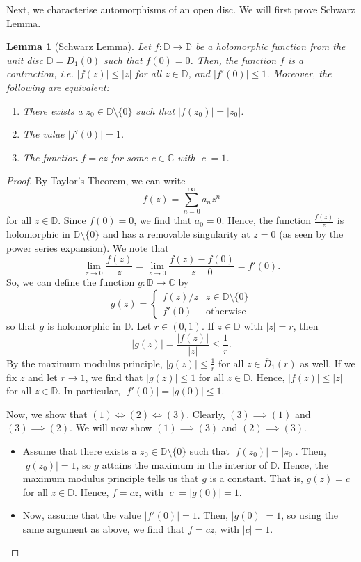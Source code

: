 \documentclass[a4paper, openany]{memoir}
\theoremstyle{definition}
\theoremstyle{plain}
\newtheorem{lemma}[definition]{Lemma}
\begin{document}
    Next, we characterise automorphisms of an open disc. We will first prove Schwarz Lemma.
    \begin{lemma}[Schwarz Lemma]
        Let $f \colon \mathbb{D} \to \mathbb{D}$ be a holomorphic function from the unit disc $\mathbb{D} = D_1(0)$ such that $f(0) = 0$. Then, the function $f$ is a contraction, i.e. $|f(z)| \leq |z|$ for all $z \in \mathbb{D}$, and $|f'(0)| \leq 1$. Moreover, the following are equivalent:
        \begin{enumerate}
            \item There exists a $z_0 \in \mathbb{D} \setminus \{0\}$ such that $|f(z_0)| = |z_0|$.
            \item The value $|f'(0)| = 1$.
            \item The function $f = cz$ for some $c \in \mathbb{C}$ with $|c| = 1$.
        \end{enumerate}
    \end{lemma}
    \begin{proof}
        By Taylor's Theorem, we can write
        \[f(z) = \sum_{n=0}^\infty a_n z^n\]
        for all $z \in \mathbb{D}$. Since $f(0) = 0$, we find that $a_0 = 0$. Hence, the function $\frac{f(z)}{z}$ is holomorphic in $\mathbb{D} \setminus \{0\}$ and has a removable singularity at $z = 0$ (as seen by the power series expansion). We note that
        \[\lim_{z \to 0} \frac{f(z)}{z} = \lim_{z \to 0} \frac{f(z) - f(0)}{z - 0} = f'(0).\]
        So, we can define the function $g \colon \mathbb{D} \to \mathbb{C}$ by
        \[g(z) = \begin{cases}
            f(z)/z & z \in \mathbb{D} \setminus \{0\} \\
            f'(0) & \textrm{otherwise}
        \end{cases}\]
        so that $g$ is holomorphic in $\mathbb{D}$. Let $r \in (0, 1)$. If $z \in \mathbb{D}$ with $|z| = r$, then
        \[|g(z)| = \frac{|f(z)|}{|z|} \leq \frac{1}{r}.\]
        By the maximum modulus principle, $|g(z)| \leq \frac{1}{r}$ for all $z \in \overline{D}_1(r)$ as well. If we fix $z$ and let $r \to 1$, we find that $|g(z)| \leq 1$ for all $z \in \mathbb{D}$. Hence, $|f(z)| \leq |z|$ for all $z \in \mathbb{D}$. In particular, $|f'(0)| = |g(0)| \leq 1$.

        Now, we show that $(1) \iff (2) \iff (3)$. Clearly, $(3) \implies (1)$ and $(3) \implies (2)$. We will now show $(1) \implies (3)$ and $(2) \implies (3)$.
        \begin{itemize}
            \item Assume that there exists a $z_0 \in \mathbb{D} \setminus \{0\}$ such that $|f(z_0)| = |z_0|$. Then, $|g(z_0)| = 1$, so $g$ attains the maximum in the interior of $\mathbb{D}$. Hence, the maximum modulus principle tells us that $g$ is a constant. That is, $g(z) = c$ for all $z \in \mathbb{D}$. Hence, $f = cz$, with $|c| = |g(0)| = 1$.
            
            \item Now, assume that the value $|f'(0)| = 1$. Then, $|g(0)| = 1$, so using the same argument as above, we find that $f = cz$, with $|c| = 1$.
        \end{itemize}
    \end{proof}
\end{document}
